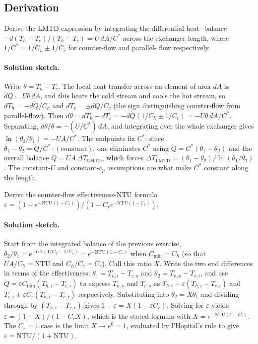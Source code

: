 \subsection*{Derivation}

\begin{exercise}
Derive the LMTD expression by integrating the differential heat-
balance $-d(T_h - T_c)/(T_h - T_c) = U \,dA/C^*$ across the exchanger
length, where $1/C^* = 1/C_h \pm 1/C_c$ for counter-flow and parallel-
flow respectively.

\paragraph{Solution sketch.} Write $\theta = T_h - T_c$. The local heat
transfer across an element of area $dA$ is $d\dot{Q} = U\theta\,dA$,
and this heats the cold stream and cools the hot stream, so $dT_h = -d
\dot{Q}/C_h$ and $dT_c = \pm d\dot{Q}/C_c$ (the sign distinguishing
counter-flow from parallel-flow). Then $d\theta = dT_h - dT_c = -d
\dot{Q}(1/C_h \pm 1/C_c) = -U\theta\,dA/C^*$. Separating, $d\theta/
\theta = -(U/C^*)\,dA$, and integrating over the whole exchanger gives
$\ln(\theta_2/\theta_1) = -UA/C^*$. The endpoints fix $C^*$: since
$\theta_1 - \theta_2 = \dot{Q}/C^* \cdot (\text{constant})$, one
eliminates $C^*$ using $\dot{Q} = C^*(\theta_1 - \theta_2)$ and the
overall balance $\dot{Q} = UA\,\Delta T_{\text{LMTD}}$, which forces
$\Delta T_{\text{LMTD}} = (\theta_1 - \theta_2)/\ln(\theta_1/\theta_2)$.
The constant-$U$ and constant-$c_p$ assumptions are what make $C^*$
constant along the length.
\end{exercise}

\begin{exercise}
Derive the counter-flow effectiveness-NTU formula $\varepsilon = (1
- e^{-\text{NTU}(1 - C_r)})/(1 - C_r e^{-\text{NTU}(1 - C_r)})$.

\paragraph{Solution sketch.} Start from the integrated balance of the
previous exercise, $\theta_2/\theta_1 = e^{-UA(1/C_h - 1/C_c)} =
e^{-\text{NTU}(1 - C_r)}$ when $C_{\min} = C_h$ (so that $UA/C_h =
\text{NTU}$ and $C_h/C_c = C_r$). Call this ratio $X$. Write the two
end differences in terms of the effectiveness: $\theta_1 = T_{h,i} -
T_{c,o}$ and $\theta_2 = T_{h,o} - T_{c,i}$, and use $\dot{Q} =
\varepsilon C_{\min}(T_{h,i} - T_{c,i})$ to express $T_{h,o}$ and
$T_{c,o}$ as $T_{h,i} - \varepsilon(T_{h,i} - T_{c,i})$ and $T_{c,i} +
\varepsilon C_r(T_{h,i} - T_{c,i})$ respectively. Substituting into
$\theta_2 = X\theta_1$ and dividing through by $(T_{h,i} - T_{c,i})$
gives $1 - \varepsilon = X(1 - \varepsilon C_r)$. Solving for
$\varepsilon$ yields $\varepsilon = (1 - X)/(1 - C_r X)$, which is the
stated formula with $X = e^{-\text{NTU}(1 - C_r)}$. The $C_r = 1$ case
is the limit $X \to e^{0} = 1$, evaluated by l'Hopital's rule to give
$\varepsilon = \text{NTU}/(1 + \text{NTU})$.
\end{exercise}

